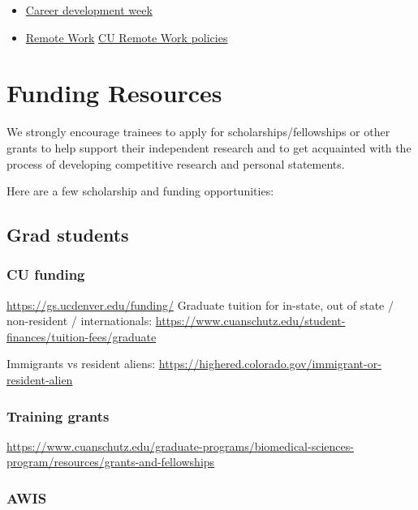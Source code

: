 \documentclass[
  letterpaper,
  DIV=11,
  numbers=noendperiod]{scrreprt}
\providecommand{\tightlist}{%
  \setlength{\itemsep}{0pt}\setlength{\parskip}{0pt}}\usepackage{longtable,booktabs,array}
\begin{document}
\begin{itemize}
\tightlist
\item
  \href{https://github.com/JRaviLab/group/blob/master/docs/career_dev_week.md}{Career
  development week}
\item
  \href{https://github.com/JRaviLab/group/blob/master/docs/howto_work_remotely.md}{Remote
  Work} \textbar{} \href{}{CU Remote Work policies}
\end{itemize}


\hypertarget{funding-resources}{%
\chapter{Funding Resources}\label{funding-resources}}

We strongly encourage trainees to apply for scholarships/fellowships or
other grants to help support their independent research and to get
acquainted with the process of developing competitive research and
personal statements.

Here are a few scholarship and funding opportunities:

\hypertarget{grad-students}{%
\section{Grad students}\label{grad-students}}

\hypertarget{cu-funding}{%
\subsection{CU funding}\label{cu-funding}}

\url{https://gs.ucdenver.edu/funding/} Graduate tuition for in-state,
out of state / non-resident / internationals:
\url{https://www.cuanschutz.edu/student-finances/tuition-fees/graduate}

Immigrants vs resident aliens:
\url{https://highered.colorado.gov/immigrant-or-resident-alien}

\hypertarget{training-grants}{%
\subsection{Training grants}\label{training-grants}}

\url{https://www.cuanschutz.edu/graduate-programs/biomedical-sciences-program/resources/grants-and-fellowships}

\hypertarget{awis}{%
\subsection{AWIS}\label{awis}}
\end{document}

